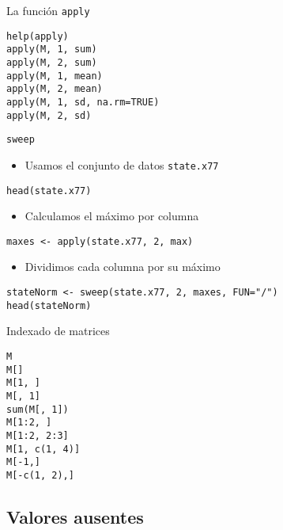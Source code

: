 \documentclass[xcolor={usenames,svgnames,dvipsnames}]{beamer}
\begin{document}
\begin{frame}[fragile,label=sec-2-2-6]{La función \texttt{apply}}
 \lstset{language=R,numbers=none}
\begin{lstlisting}
help(apply)
apply(M, 1, sum)
apply(M, 2, sum)
apply(M, 1, mean)
apply(M, 2, mean)
apply(M, 1, sd, na.rm=TRUE)
apply(M, 2, sd)
\end{lstlisting}
\end{frame}
\begin{frame}[fragile,label=sec-2-2-7]{\texttt{sweep}}
 \begin{itemize}
\item Usamos el conjunto de datos \texttt{state.x77}
\end{itemize}
\lstset{language=R,numbers=none}
\begin{lstlisting}
head(state.x77)
\end{lstlisting}
\begin{itemize}
\item Calculamos el máximo por columna
\end{itemize}
\lstset{language=R,numbers=none}
\begin{lstlisting}
maxes <- apply(state.x77, 2, max)
\end{lstlisting}
\begin{itemize}
\item Dividimos cada columna por su máximo
\end{itemize}
\lstset{language=R,numbers=none}
\begin{lstlisting}
stateNorm <- sweep(state.x77, 2, maxes, FUN="/")
head(stateNorm)
\end{lstlisting}
\end{frame}
\begin{frame}[fragile,label=sec-2-2-8]{Indexado de matrices}
 \lstset{language=R,numbers=none}
\begin{lstlisting}
M
M[]
M[1, ]
M[, 1]
sum(M[, 1])
M[1:2, ]
M[1:2, 2:3]
M[1, c(1, 4)]
M[-1,]
M[-c(1, 2),]
\end{lstlisting}
\end{frame}

\subsection{Valores ausentes}
\label{sec-2-3}
\end{document}
